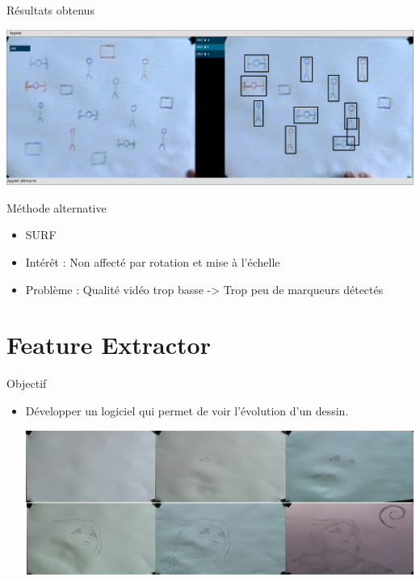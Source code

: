 \documentclass[t,14pt]{beamer}
\begin{document}
\begin{frame}{Résultats obtenus}
\vspace{5mm}
\begin{center}
\includegraphics[width=\textwidth]{images/capture2.png}
\end{center}
\end{frame}

\begin{frame}{Méthode alternative}
\vspace{5mm}
\begin{itemize}
\item SURF
\item Intérêt : Non affecté par rotation et mise à l'échelle 
\item Problème : Qualité vidéo trop basse -> Trop peu de marqueurs détectés
\end{itemize}
\end{frame}
	
\section[Extraction de nouveautés]{Feature Extractor}
\begin{frame}{Objectif}
\vspace{5mm}
\begin{itemize}
\item Développer un logiciel qui permet de voir l'évolution d'un dessin.
\vspace{5mm}
\begin{center}
\includegraphics[scale=0.5]{images/evo/evo.png}
\end{center}
\end{itemize}
\end{frame}
\end{document}
